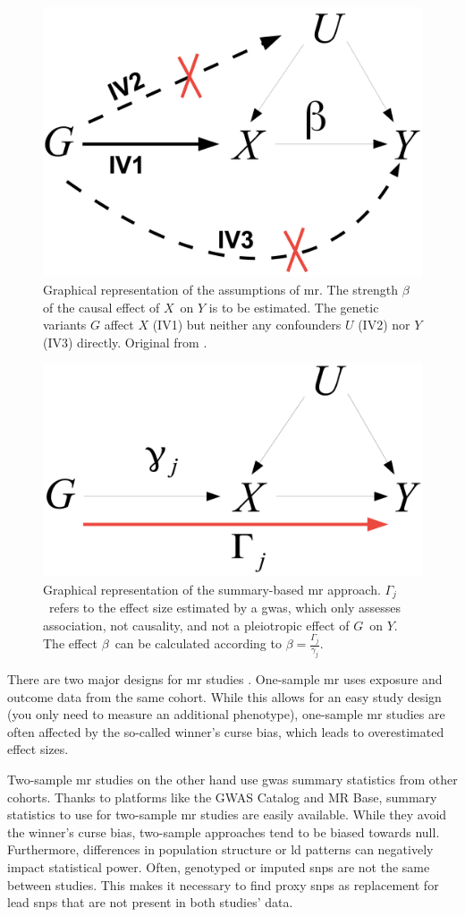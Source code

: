 \documentclass[draft]{scrbook}
\begin{document}
\begin{figure}
    \centering
    \includegraphics[width=.5\textwidth]{img/mr_assumptions.png}
    \caption{Graphical representation of the assumptions of \gls{mr}.
    The strength $\beta$ of the causal effect of $X$ on $Y$ is to be estimated.
    The genetic variants $G$ affect $X$ (IV1) but neither any confounders $U$ (IV2) nor $Y$ (IV3) directly.
    Original from \cite{J2015}.}
    \label{fig:mr}
\end{figure}

\begin{figure}
    \centering
    \includegraphics[width=.5\textwidth]{img/two_sample_mr.png}
    \caption{Graphical representation of the summary-based \gls{mr} approach.
        $\Gamma_j$ refers to the effect size estimated by a \gls{gwas}, which only assesses association, not causality, and not a pleiotropic effect of $G$ on $Y$.
        The effect $\beta$ can be calculated according to $\beta=\frac{\Gamma_j}{\gamma_j}$.
    }
    \label{fig:two-sample-mr}
\end{figure}


There are two major designs for \gls{mr} studies \cite{Burgess2019}.
One-sample \gls{mr} uses exposure and outcome data from the same cohort.
While this allows for an easy study design (you only need to measure an additional phenotype), one-sample \gls{mr} studies are often affected by the so-called winner's curse bias, which leads to overestimated effect sizes.

Two-sample \gls{mr} studies on the other hand use \gls{gwas} summary statistics from other cohorts.
Thanks to platforms like the GWAS Catalog and MR Base, summary statistics to use for two-sample \gls{mr} studies are easily available.
While they avoid the winner's curse bias, two-sample approaches tend to be biased towards null.
Furthermore, differences in population structure or \gls{ld} patterns can negatively impact statistical power.
Often, genotyped or imputed \glspl{snp} are not the same between studies.
This makes it necessary to find proxy \glspl{snp} as replacement for lead \glspl{snp} that are not present in both studies' data.
\end{document}
